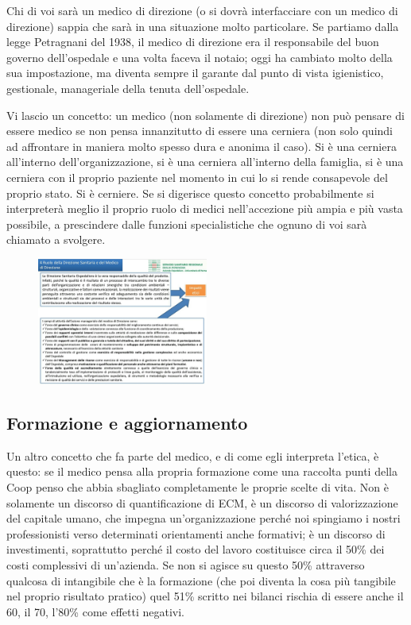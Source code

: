 Chi di voi sarà un medico di direzione (o si dovrà interfacciare con un
medico di direzione) sappia che sarà in una situazione molto
particolare. Se partiamo dalla legge Petragnani del 1938, il medico di
direzione era il responsabile del buon governo dell'ospedale e una volta
faceva il notaio; oggi ha cambiato molto della sua impostazione, ma
diventa sempre il garante dal punto di vista igienistico, gestionale,
manageriale della tenuta dell'ospedale.

Vi lascio un concetto: un medico (non solamente di direzione) non può
pensare di essere medico se non pensa innanzitutto di essere una
cerniera (non solo quindi ad affrontare in maniera molto spesso dura e
anonima il caso). Si è una cerniera all'interno dell'organizzazione, si
è una cerniera all'interno della famiglia, si è una cerniera con il
proprio paziente nel momento in cui lo si rende consapevole del proprio
stato. Si è cerniere. Se si digerisce questo concetto probabilmente si
interpreterà meglio il proprio ruolo di medici nell'accezione più ampia
e più vasta possibile, a prescindere dalle funzioni specialistiche che
ognuno di voi sarà chiamato a svolgere.

 \begin{figure}[!ht]
\centering
	\includegraphics[width=0.5\textwidth]{32/image19.jpeg}
	\end{figure}

\subsection{Formazione e aggiornamento}

Un altro concetto che fa parte del medico, e di come egli interpreta
l'etica, è questo: se il medico pensa alla propria formazione come una
raccolta punti della Coop penso che abbia sbagliato completamente le
proprie scelte di vita. Non è solamente un discorso di quantificazione
di ECM, è un discorso di valorizzazione del capitale umano, che impegna
un'organizzazione perché noi spingiamo i nostri professionisti verso
determinati orientamenti anche formativi; è un discorso di investimenti,
soprattutto perché il costo del lavoro costituisce circa il 50\% dei
costi complessivi di un'azienda. Se non si agisce su questo 50\%
attraverso qualcosa di intangibile che è la formazione (che poi diventa
la cosa più tangibile nel proprio risultato pratico) quel 51\% scritto
nei bilanci rischia di essere anche il 60, il 70, l'80\% come effetti
negativi.

